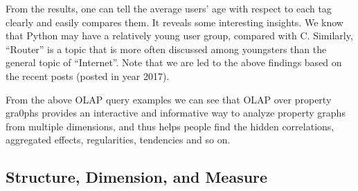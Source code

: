 From the results, one can tell the average users' age with respect to each tag clearly and easily compares them. It reveals some interesting insights. We know that Python may have a relatively young user group, compared with C. Similarly, ``Router'' is a topic that is more often discussed among youngsters than the general topic of ``Internet''. Note that we are led to the above findings based on the recent posts (posted in year 2017).

%
%
%
%	
%	
%

From the above OLAP query examples we can see that OLAP over property gra0phs provides an interactive and informative way to analyze property graphs from multiple dimensions, and thus helps people find the hidden correlations, aggregated effects, regularities, tendencies and so on.

\subsection{Structure, Dimension, and Measure}
\label{Structure, Dimension, and Measure}

